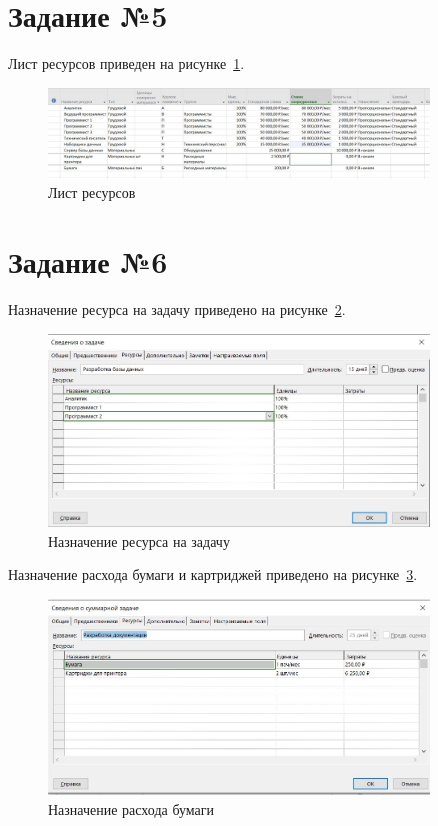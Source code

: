 \section{Задание №5}

Лист ресурсов приведен на рисунке~\ref{fig:list}.

\begin{figure}[H]
	\centering
	\includegraphics[width=0.9\textwidth]{img/task5/screen5_1.jpg}
	\caption{Лист ресурсов}
	\label{fig:list}
\end{figure}

\section{Задание №6}

Назначение ресурса на задачу приведено на рисунке~\ref{fig:resourse}.

\begin{figure}[H]
	\centering
	\includegraphics[width=0.9\textwidth]{img/task6/screen6_1.jpg}
	\caption{Назначение ресурса на задачу}
	\label{fig:resourse}
\end{figure}

Назначение расхода бумаги и картриджей приведено на рисунке~\ref{fig:paper}.

\begin{figure}[H]
	\centering
	\includegraphics[width=0.9\textwidth]{img/task6/screen6_3.jpg}
	\caption{Назначение расхода бумаги}
	\label{fig:paper}
\end{figure}

